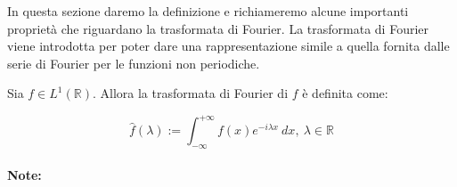 In questa sezione daremo la definizione e richiameremo alcune importanti
proprietà che riguardano la trasformata di Fourier. La trasformata di Fourier
viene introdotta per poter dare una rappresentazione simile a quella fornita
dalle serie di Fourier per le funzioni non periodiche.

\begin{definition}
    Sia $f \in L^1(\mathbb{R})$. Allora la trasformata di Fourier di $f$ è
    definita come:

    $$
        \hat{f}(\lambda) := \int_{-\infty}^{+\infty} f(x) e^{-i\lambda x} \ dx, \ \lambda \in \mathbb{R}
    $$
\end{definition}

\paragraph{Note:}
